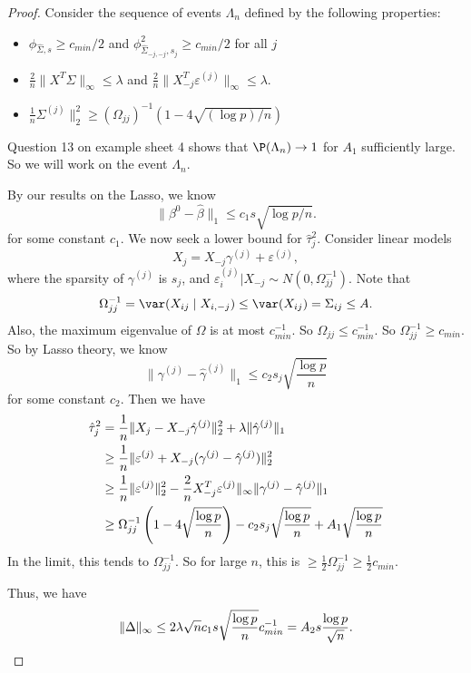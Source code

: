 \documentclass[a4paper]{article}
\begin{document}
\begin{proof}
  Consider the sequence of events $\Lambda_n$ defined by the following properties:
  \begin{itemize}
    \item $\phi_{\hat{\Sigma}, s} \geq c_{min}/2$ and $\phi^2_{\hat{\Sigma}_{-j, -j}, s_j} \geq c_{min}/2$ for all $j$
    \item $\frac{2}{n} \|X^T \Sigma\|_\infty \leq \lambda$ and $\frac{2}{n} \|X_{-j}^T \varepsilon^{(j)} \|_\infty \leq \lambda$.
    \item $\frac{1}{n} \Sigma^{(j)} \|_2^2 \geq (\Omega_{jj})^{-1} (1 - 4 \sqrt{(\log p) / n})$
  \end{itemize}

  Question 13 on example sheet 4 shows that $\P(\Lambda_n) \to 1$ for $A_1$ sufficiently large. So we will work on the event $\Lambda_n$.

  By our results on the Lasso, we know
  \[
    \|\beta^0 - \hat{\beta}\|_1 \leq c_1 s \sqrt{\log p / n}.
  \]
  for some constant $c_1$. We now seek a lower bound for $\hat{\tau}_j^2$. Consider linear models
  \[
    X_j = X_{-j} \gamma^{(j)} + \varepsilon^{(j)},
  \]
  where the sparsity of $\gamma^{(j)}$ is $s_j$, and $\varepsilon_i^{(j)}| X_{-j} \sim N(0, \Omega_{jj}^{-1})$. Note that
  \[
    \Omega_{jj}^{-1} = \var (X_{ij} \mid X_{i, -j}) \leq \var(X_{ij}) = \Sigma_{ij} \leq A.
  \]
  Also, the maximum eigenvalue of $\Omega$ is at most $c_{min}^{-1}$. So $\Omega_{jj} \leq c_{min}^{-1}$. So $\Omega_{jj}^{-1} \geq c_{min}$. So by Lasso theory, we know
  \[
    \|\gamma^{(j)} - \hat{\gamma}^{(j)}\|_1 \leq c_2 s_j \sqrt{\frac{\log p}{n}}
  \]
  for some constant $c_2$. Then we have
  \begin{align*}
    \hat{\tau}_j^2 &= \frac{1}{n} \|X_j - X_{-j} \hat{\gamma}^{(j)} \|_2^2 + \lambda \|\hat{\gamma}^{(j)} \|_1\\
    &\geq \frac{1}{n} \|\varepsilon^{(j)} + X_{-j} (\gamma^{(j)} - \hat{\gamma}^{(j)})\|_2^2\\
    &\geq \frac{1}{n} \|\varepsilon^{(j)}\|_2^2 - \frac{2}{n} X_{-j}^T \varepsilon^{(j)}\|_\infty \|\gamma^{(j)} - \hat{\gamma}^{(j)}\|_1\\
    &\geq \Omega_{jj}^{-1} \left(1 - 4\sqrt{{\log p} \over n}\right) - c_2 s_j \sqrt{\frac{\log p}{n}} + A_1 \sqrt{\frac{\log p}{n}}
  \end{align*}
  In the limit, this tends to $\Omega_{jj}^{-1}$. So for large $n$, this is $\geq \frac{1}{2} \Omega_{jj}^{-1} \geq \frac{1}{2} c_{min}$.

  Thus, we have
  \[
    \|\Delta\|_\infty \leq 2\lambda \sqrt{n} c_1 s \sqrt{\frac{\log p}{n}} c_{min}^{-1} = A_2 s \frac{\log p}{\sqrt{n}}.\qedhere
  \]
\end{proof}


\printindex
\end{document}
